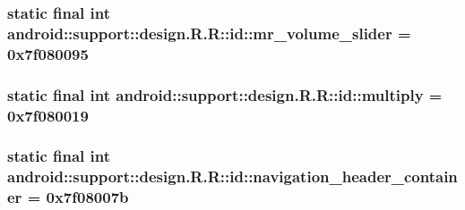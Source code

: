 \hypertarget{classandroid_1_1support_1_1design_1_1_r_1_1id_b2ae222c90fdb3581a7c854a903f07d4}{
\subsubsection[{mr\_\-volume\_\-slider}]{\setlength{\rightskip}{0pt plus 5cm}static final int android::support::design.R.R::id::mr\_\-volume\_\-slider = 0x7f080095}}
\label{classandroid_1_1support_1_1design_1_1_r_1_1id_b2ae222c90fdb3581a7c854a903f07d4}


\hypertarget{classandroid_1_1support_1_1design_1_1_r_1_1id_94982bfb77b0da83770741db0da807ab}{
\subsubsection[{multiply}]{\setlength{\rightskip}{0pt plus 5cm}static final int android::support::design.R.R::id::multiply = 0x7f080019}}
\label{classandroid_1_1support_1_1design_1_1_r_1_1id_94982bfb77b0da83770741db0da807ab}


\hypertarget{classandroid_1_1support_1_1design_1_1_r_1_1id_6560cf039650a215698a1764ec0adba4}{
\subsubsection[{navigation\_\-header\_\-container}]{\setlength{\rightskip}{0pt plus 5cm}static final int android::support::design.R.R::id::navigation\_\-header\_\-container = 0x7f08007b}}
\label{classandroid_1_1support_1_1design_1_1_r_1_1id_6560cf039650a215698a1764ec0adba4}


